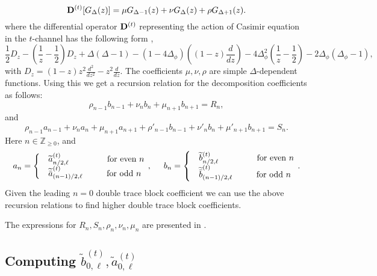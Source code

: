 \documentclass[12pt]{article}
\numberwithin{equation}{section}
\newcommand{\be}{\begin{equation}}
\newcommand{\ee}{\end{equation}}
\def\D{\Delta}
\begin{document}
\begin{equation}
{\bf{D}}^{(t)}[G_{\Delta}(z)]=\mu G_{\Delta-1}(z)+\nu G_{\Delta}(z)+\rho G_{\Delta+1}(z).
\end{equation}
where the differential operator ${\bf{D}}^{(t)}$ representing the action of Casimir equation in the $t$-channel has the following form \cite{Zhou:2018sfz},
\begin{equation}
\frac{1}{2} D_z-(\frac{1}{z}-\frac{1}{2})D_z+\Delta(\Delta-1)-(1-4\Delta_{\phi})((1-z)\frac{d}{dz})-4 \Delta_{\phi}^2 (\frac{1}{z}-\frac{1}{2})-2\Delta_{\phi}(\Delta_{\phi}-1),
\end{equation}
with $D_z=(1-z)z^2\frac{d^2}{dz^2}-z^2\frac{d}{dz}$. The coefficients $\mu,\nu,\rho$ are simple  $\D$-dependent functions. Using this we get a recursion relation for the decomposition coefficients as follows:
\begin{equation}
\rho_{n-1} b_{n-1} +\nu_n b_n +\mu_{n+1} b_{n+1}=R_n,
\end{equation}
and 
\begin{equation}
\rho_{n-1} a_{n-1}+\nu_n a_n+\mu_{n+1} a_{n+1}+\rho'_{n-1} b_{n-1}+\nu'_{n} b_n +\mu'_{n+1} b_{n+1}=S_n.
\end{equation}
Here $n\in \mathbb{Z}_{\geq 0}$,  and
\be
a_n=\begin{cases}& \widetilde{a}_{n/2 ,\ell}^{(t)} \hspace{1.6cm} \text{for even $n$} \\
	& \widetilde{\bar{a}}_{(n-1)/2,\ell}^{(t)}  \hspace{1cm} \text{for odd $n$}  \end{cases}\,, \hspace{0.5cm}
b_n=\begin{cases}& \widetilde{b}_{n/2,\ell}^{(t)} \hspace{1.6cm} \text{for even $n$} \\
	& \widetilde{\bar{b}}_{(n-1)/2,\ell}^{(t)}  \hspace{1cm} \text{for odd $n$} \, \end{cases}\,.
\ee
Given the leading $n=0$ double trace block coefficient we can use the above recursion relations to find higher double trace block coefficients.

The expressions for $R_n, S_n, \rho_n, \nu_n, \mu_n$ are presented in \cite{notebook}.


\subsection{Computing $\tilde{b}^{(t)}_{0,\ell},\tilde{a}^{(t)}_{0,\ell} $}	
\end{document}

